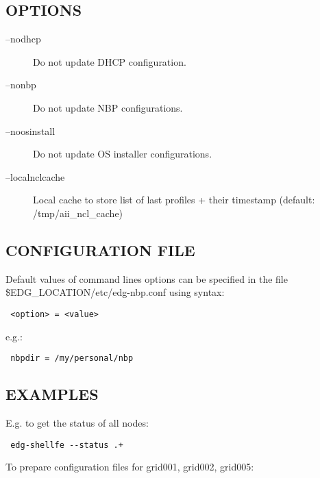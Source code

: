 \subsection*{OPTIONS\label{edg-shellfe_OPTIONS}}
\begin{description}

\item[--nodhcp] \mbox{}

Do not update DHCP configuration.


\item[--nonbp] \mbox{}

Do not update NBP configurations.


\item[--noosinstall] \mbox{}

Do not update OS installer configurations.


\item[--localnclcache] \mbox{}

Local cache to store list of last profiles + their timestamp
(default: /tmp/aii\_ncl\_cache)

\end{description}
\subsection*{CONFIGURATION FILE\label{edg-shellfe_CONFIGURATION_FILE}}


Default values of command lines options can be specified in the file
\$EDG\_LOCATION/etc/edg-nbp.conf using syntax:

\begin{verbatim}
 <option> = <value>
\end{verbatim}


e.g.:

\begin{verbatim}
 nbpdir = /my/personal/nbp
\end{verbatim}
\subsection*{EXAMPLES\label{edg-shellfe_EXAMPLES}}


E.g. to get the status of all nodes:

\begin{verbatim}
 edg-shellfe --status .+
\end{verbatim}


To prepare configuration files for grid001, grid002, grid005:

